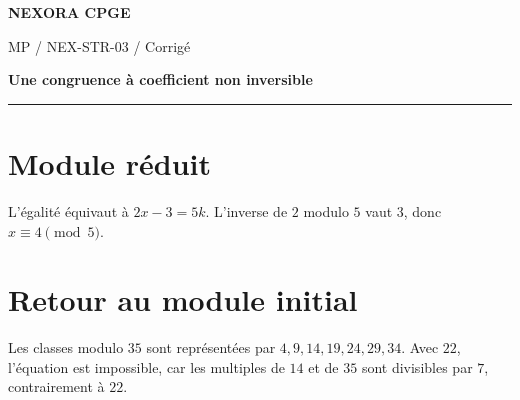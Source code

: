 \documentclass[11pt,a4paper]{article}
\begin{document}
{\small\bfseries\color{nexorablue} NEXORA CPGE}\par
{\small MP / NEX-STR-03 / Corrigé}\par
{\LARGE\bfseries Une congruence à coefficient non inversible}\par
\vspace{0.25em}\hrule\vspace{0.6em}

\section*{Module réduit}
L’égalité équivaut à $2x-3=5k$. L’inverse de $2$ modulo $5$ vaut $3$, donc $x\equiv4\pmod5$.

\section*{Retour au module initial}
Les classes modulo $35$ sont représentées par $4,9,14,19,24,29,34$. Avec $22$, l’équation est impossible, car les multiples de $14$ et de $35$ sont divisibles par $7$, contrairement à $22$.
\end{document}
